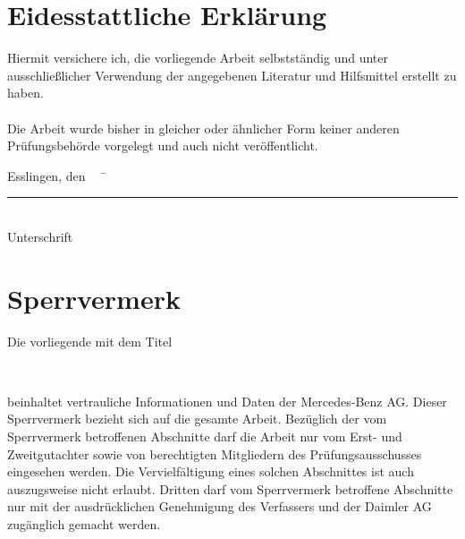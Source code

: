 \chapter*{Eidesstattliche Erklärung}

Hiermit versichere ich, die vorliegende Arbeit selbstständig und unter ausschließlicher Verwendung der angegebenen Literatur und Hilfsmittel erstellt zu haben.\\\\
Die Arbeit wurde bisher in gleicher oder ähnlicher Form keiner anderen Prüfungsbehörde vorgelegt und auch nicht veröffentlicht.\\
\begin{tabbing}
          Esslingen, den \workDatum ~~	\= \rule{5cm}{0.3mm}\\
                                                                                                    \> Unterschrift
\end{tabbing}
%
\newpage
%
\chapter*{Sperrvermerk} %



Die vorliegende \workTyp mit dem Titel \\  
\begin{center} \titleemph{\workTitel} \\ \end{center}
beinhaltet vertrauliche Informationen und Daten der Mercedes-Benz AG.
Dieser Sperrvermerk bezieht sich auf die gesamte Arbeit.
Bezüglich der vom Sperrvermerk betroffenen Abschnitte darf die Arbeit nur vom Erst- und Zweitgutachter sowie von berechtigten Mitgliedern des Prüfungsausschusses eingesehen werden. Die Vervielfältigung eines solchen Abschnittes ist auch auszugsweise nicht erlaubt.
Dritten darf vom Sperrvermerk betroffene Abschnitte nur mit der ausdrücklichen Genehmigung des Verfassers und der Daimler AG zugänglich gemacht werden. 
\newpage
%